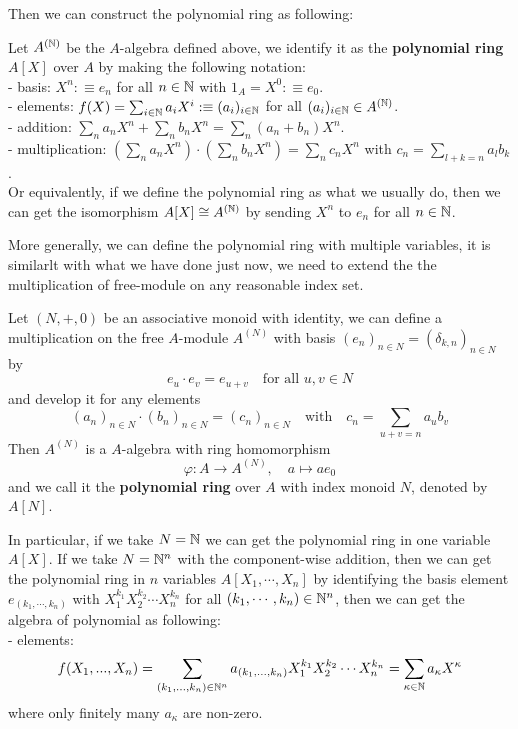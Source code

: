     Then we can construct the polynomial ring as following:
    \begin{definition}
        Let \(A^{(\mathbb{N})}\) be the \(A\)-algebra defined above, we identify it as the \textbf{polynomial ring} \(A[X]\) over \(A\) by making the following notation:\\
        - basis: \(X^n :\equiv e_n\) for all \(n \in \mathbb{N}\) with \(1_A = X^0 :\equiv e_0\).\\
        - elements: \( f(X) = \sum_{i \in \mathbb{N}} a_i X^i :\equiv (a_i)_{i \in \mathbb{N}} \) for all \((a_i)_{i \in \mathbb{N}} \in A^{(\mathbb{N})}\).\\
        - addition: \(\sum_n a_nX^n +\sum_n b_nX^n = \sum_n (a_n+b_n)X^n\).\\
        - multiplication: \((\sum_n a_nX^n) \cdot (\sum_n b_nX^n) = \sum_n c_n X^n\) with \(c_n = \sum_{l+k=n} a_l b_k\).\\

        Or equivalently, if we define the polynomial ring as what we usually do, then we can get the isomorphism \(A[X] \cong A^{(\mathbb{N})}\) by sending \(X^n\) to \(e_n\) for all \(n \in \mathbb{N}\).
    \end{definition}

    More generally, we can define the polynomial ring with multiple variables, it is similarlt with what we have done just now, we need to extend the the multiplication of free-module on any reasonable index set.
    \begin{definition}
        Let \((N,+,0)\) be an associative monoid with identity, we can define a multiplication on the free \(A\)-module \(A^{(N)}\) with basis \((e_n)_{n \in N} = (\delta_{k,n})_{n \in N}\) by
        \[e_u \cdot e_v = e_{u+v}\quad \text{for all } u,v \in N\]
        and develop it for any elements
        \[(a_n)_{n \in N} \cdot (b_n)_{n \in N} = (c_n)_{n \in N} \quad \text{with} \quad c_n = \sum_{u+v=n} a_u b_v\]
        Then \(A^{(N)}\) is a \(A\)-algebra with ring homomorphism 
        \[\varphi: A \to A^{(N)}, \quad a \mapsto ae_0\]
        and we call it the \textbf{polynomial ring} over \(A\) with index monoid \(N\), denoted by \(A[N]\).
    \end{definition}

    In particular, if we take \(N = \mathbb{N}\) we can get the polynomial ring in one variable \(A[X]\). If we take \(N = \mathbb{N}^n\) with the component-wise addition, then we can get the polynomial ring in \(n\) variables \(A[X_1,\cdots,X_n]\) by identifying the basis element \(e_{(k_1,\cdots,k_n)}\) with \(X_1^{k_1}X_2^{k_2}\cdots X_n^{k_n}\) for all \((k_1,\cdots,k_n) \in \mathbb{N}^n\), then we can get the algebra of polynomial as following:\\
    - elements:
    \[f(X_1,...,X_n) = \sum_{(k_1,\dots,k_n) \in \mathbb{N}^n} a_{(k_1,\dots,k_n)} X_1^{k_1}X_2^{k_2}\cdots X_n^{k_n} = \sum_{\kappa \in \mathbb{N}} a_{\kappa} X^{\kappa}\]
    where only finitely many \(a_{\kappa}\) are non-zero.\\

